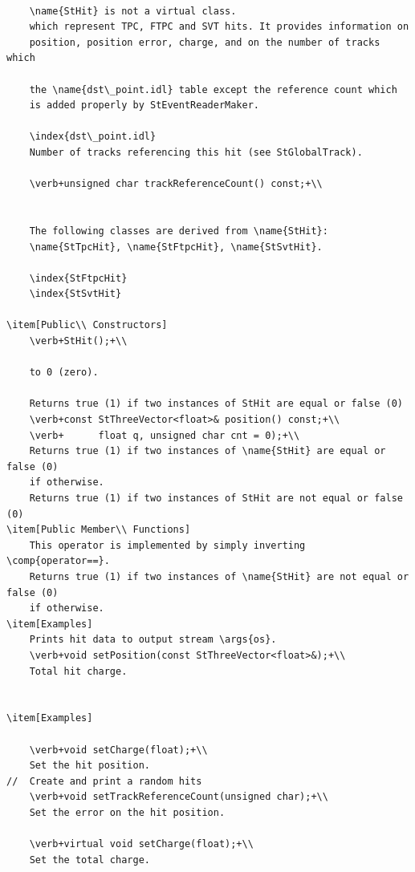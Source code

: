 {\begin{verbatim}
        
    \name{StHit} is not a virtual class.
    which represent TPC, FTPC and SVT hits. It provides information on
    position, position error, charge, and on the number of tracks which
    
    the \name{dst\_point.idl} table except the reference count which
    is added properly by StEventReaderMaker.
    
    \index{dst\_point.idl}
    Number of tracks referencing this hit (see StGlobalTrack).
    
    \verb+unsigned char trackReferenceCount() const;+\\    

    
    The following classes are derived from \name{StHit}:
    \name{StTpcHit}, \name{StFtpcHit}, \name{StSvtHit}.
    
    \index{StFtpcHit}
    \index{StSvtHit}
    
\item[Public\\ Constructors]
    \verb+StHit();+\\
    
    to 0 (zero).

    Returns true (1) if two instances of StHit are equal or false (0)
    \verb+const StThreeVector<float>& position() const;+\\
    \verb+      float q, unsigned char cnt = 0);+\\
    Returns true (1) if two instances of \name{StHit} are equal or false (0)
    if otherwise.
    Returns true (1) if two instances of StHit are not equal or false (0)
\item[Public Member\\ Functions]
    This operator is implemented by simply inverting \comp{operator==}.
    Returns true (1) if two instances of \name{StHit} are not equal or false (0)
    if otherwise. 
\item[Examples]
    Prints hit data to output stream \args{os}.
    \verb+void setPosition(const StThreeVector<float>&);+\\
    Total hit charge.

    
\item[Examples] 

    \verb+void setCharge(float);+\\
    Set the hit position.
//  Create and print a random hits 
    \verb+void setTrackReferenceCount(unsigned char);+\\
    Set the error on the hit position.

    \verb+virtual void setCharge(float);+\\
    Set the total charge.


\end{verbatim}}

